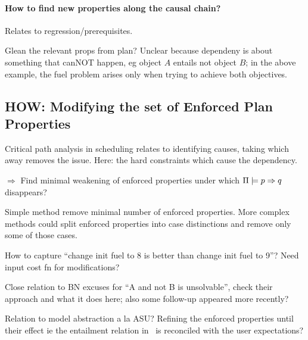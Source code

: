 \paragraph{How to find new properties along the causal chain?}

Relates to regression/prerequisites.

Glean the relevant props from plan? Unclear because dependeny is about
something that canNOT happen, eg object $A$ entails not object $B$; in
the above example, the fuel problem arises only when trying to achieve
both objectives.







  


\subsection{HOW: Modifying the set of Enforced Plan Properties}
\label{xpp:identify-causes:enforced}

Critical path analysis in scheduling relates to identifying causes,
taking which away removes the issue. Here: the hard constraints which
cause the dependency.

$\Rightarrow$ Find minimal weakening of enforced properties under
which $\Pi \models p \Rightarrow q$ disappears?

Simple method remove minimal number of enforced properties. More
complex methods could split enforced properties into case distinctions
and remove only some of those cases.

How to capture ``change init fuel to 8 is better than change init fuel
to 9''? Need input cost fn for modifications?

Close relation to BN excuses for ``A and not B is unsolvable'', check
their approach and what it does here; also some follow-up appeared
more recently? 

Relation to model abstraction a la ASU? Refining the enforced
properties until their effect ie the entailment relation in \plans\ is
reconciled with the user expectations?

















